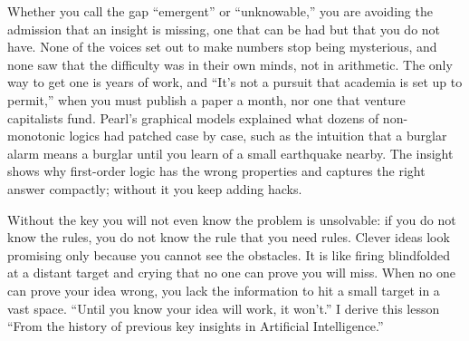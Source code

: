Whether you call the gap ``emergent'' or ``unknowable,'' you are avoiding the admission that an insight is missing, one that can be had but that you do not have. None of the voices set out to make numbers stop being mysterious, and none saw that the difficulty was in their own minds, not in arithmetic. The only way to get one is years of work, and ``It's not a pursuit that academia is set up to permit,'' when you must publish a paper a month, nor one that venture capitalists fund.  Pearl's graphical models explained what dozens of non-monotonic logics had patched case by case, such as the intuition that a burglar alarm means a burglar until you learn of a small earthquake nearby. The insight shows why first-order logic has the wrong properties and captures the right answer compactly; without it you keep adding hacks.

Without the key you will not even know the problem is unsolvable: if you do not know the rules, you do not know the rule that you need rules. Clever ideas look promising only because you cannot see the obstacles. It is like firing blindfolded at a distant target and crying that no one can prove you will miss. When no one can prove your idea wrong, you lack the information to hit a small target in a vast space. ``Until you know your idea will work, it won't.'' I derive this lesson ``From the history of previous key insights in Artificial Intelligence.'' 
